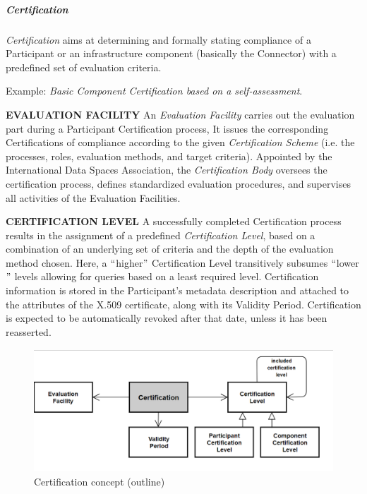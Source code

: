 

\subparagraph*{Certification}
\textit{Certification} aims at determining and formally stating compliance of a Participant or an infrastructure component (basically the Connector) with a predefined set of evaluation criteria. 

Example: \textit{Basic Component Certification based on a self-assessment}.

\textbf{EVALUATION FACILITY }An \textit{Evaluation Facility} carries out the evaluation part during a Participant Certification process, It issues the corresponding Certifications of compliance according to the given \textit{Certification Scheme} (i.e. the processes, roles, evaluation methods, and target criteria). Appointed by the International Data Spaces Association, the \textit{Certification Body }oversees the certification process, defines standardized evaluation procedures, and supervises all activities of the Evaluation Facilities. 

\textbf{CERTIFICATION LEVEL} A successfully completed Certification process results in the assignment of a predefined \textit{Certification Level}, based on a combination of an underlying set of criteria and the depth of the evaluation method chosen. Here, a $``$higher$"$  Certification Level transitively subsumes $``$lower$"$  levels allowing for queries based on a least required level. Certification information is stored in the Participant’s metadata description and attached to the attributes of the X.509 certificate, along with its Validity Period. Certification is expected to be automatically revoked after that date, unless it has been reasserted. 




\begin{figure}[H]
	\begin{Center}
		\includegraphics[width=4.5in,height=1.81in]{./media/image51.png}
		\caption{Certification concept (outline)}
		\label{fig:Certification_concept_outline}
	\end{Center}
\end{figure}


